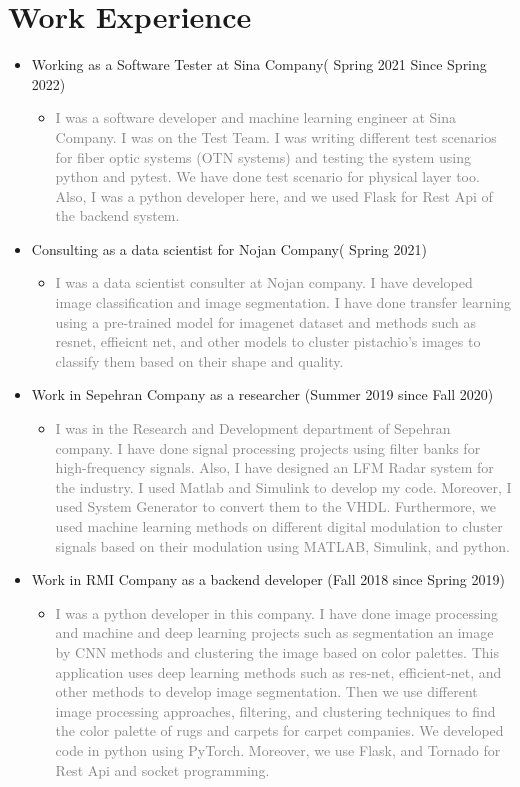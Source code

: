 \documentclass[10pt,a4paper,sans]{moderncv} %
\begin{document}
\section{ Work Experience}
\begin{itemize}
\item Working as a Software Tester at Sina Company( Spring 2021 Since Spring 2022)
\begin{itemize}
\item
\textcolor{gray}{I was a software developer and machine learning engineer at Sina Company. I was on the Test Team. I was writing different test scenarios for fiber optic systems (OTN systems) and testing the system using
python and pytest. We have done test scenario for physical layer too.
Also, I was a python developer here, and we used Flask for Rest Api of the backend system.}
\end{itemize}
\item Consulting as a data scientist for Nojan Company( Spring 2021)
\begin{itemize}
\item
\textcolor{gray}{I was a data scientist consulter at Nojan company. I have developed image classification and image segmentation. I have done transfer learning using a pre-trained model for imagenet dataset and methods such as resnet, effieicnt net, and other models to cluster pistachio's images to classify them based on their shape and quality.}
\end{itemize}
\item Work in Sepehran Company as a  researcher (Summer 2019 since Fall 2020)
\begin{itemize}
\item
\textcolor{gray}{I was in the Research and Development department of Sepehran company. I have done signal processing projects using filter banks for 
high-frequency signals. Also, I have designed an LFM Radar system for the industry. I used Matlab and Simulink to develop my code. Moreover, I used System Generator to convert them to the VHDL. 
 Furthermore, we used machine learning methods on different digital modulation to cluster signals based on their modulation using MATLAB,  Simulink, and python.}
\end{itemize}

\item Work in RMI Company as a backend developer (Fall 2018 since Spring 2019)
\begin{itemize}
\item
\textcolor{gray}{I was a python developer in this company. I have done image processing and machine and deep learning projects such as segmentation an image by CNN methods and clustering the image based on color
palettes. This application uses deep learning methods such as res-net, efficient-net, and other methods to develop image segmentation. Then we use different image processing approaches, filtering, and clustering techniques to find the color palette of rugs and carpets for carpet companies. We developed code in python using PyTorch. Moreover, we use Flask, and Tornado for Rest Api and socket programming.}
\end{itemize}



\end{itemize}
\end{document}
